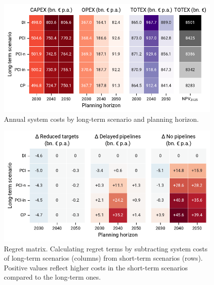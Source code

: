 \documentclass[preprint,12pt,sort&compress]{elsarticle}
\begin{document}
\begin{figure}[htbp]
  \centering
  \includegraphics[width=\textwidth]{totex_heatmap.pdf}
  \caption{Annual system costs by long-term scenario and planning horizon.}
  \label{fig:totex_heatmap}
\end{figure}

\begin{figure}[htbp]
  \centering
  \includegraphics[width=\textwidth]{regret_matrix}
  \caption{Regret matrix. Calculating regret terms by subtracting system costs of long-term scenarios (columns) from short-term scenarios (rows). Positive values reflect higher costs in the short-term scenarios compared to the long-term ones.}
  \label{fig:regret_matrix}
\end{figure}
\end{document}
